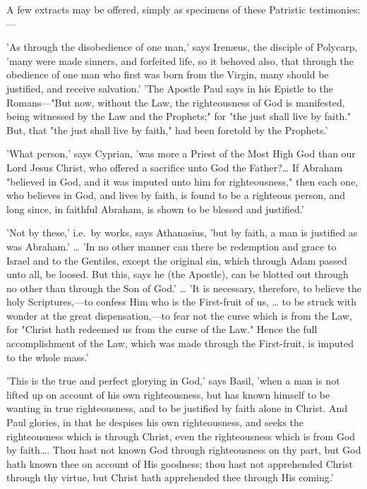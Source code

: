 \documentclass[
]{book}
\begin{document}
A few extracts may be offered, simply as specimens of these Patristic testimonies:---

'As through the disobedience of one man,' says Irenæus, the disciple of Polycarp, 'many were made sinners, and forfeited life, so it behoved also, that through the obedience of one man who first was born from the Virgin, many should be justified, and receive salvation.' 'The Apostle Paul says in his Epistle to the Romans---"But now, without the Law, the righteousness of God is manifested, being witnessed by the Law and the Prophets;" for "the just shall live by faith." But, that "the just shall live by faith," had been foretold by the Prophets.'

'What person,' says Cyprian, 'was more a Priest of the Most High God than our Lord Jesus Christ, who offered a sacrifice unto God the Father?\ldots{} If Abraham "believed in God, and it was imputed unto him for righteousness," then each one, who believes in God, and lives by faith, is found to be a righteous person, and long since, in faithful Abraham, is shown to be blessed and justified.'

'Not by these,' i.e.~by works, says Athanasius, 'but by faith, a man is justified as was Abraham.' \ldots{} 'In no other manner can there be redemption and grace to Israel and to the Gentiles, except the original sin, which through Adam passed unto all, be loosed. But this, says he (the Apostle), can be blotted out through no other than through the Son of God.' \ldots{} 'It is necessary, therefore, to believe the holy Scriptures,---to confess Him who is the First-fruit of us, \ldots{} to be struck with wonder at the great dispensation,---to fear not the curse which is from the Law, for "Christ hath redeemed us from the curse of the Law." Hence the full accomplishment of the Law, which was made through the First-fruit, is imputed to the whole mass.'

'This is the true and perfect glorying in God,' says Basil, 'when a man is not lifted up on account of his own righteousness, but has known himself to be wanting in true righteousness, and to be justified by faith alone in Christ. And Paul glories, in that he despises his own righteousness, and seeks the righteousness which is through Christ, even the righteousness which is from God by faith\ldots. Thou hast not known God through righteousness on thy part, but God hath known thee on account of His goodness; thou hast not apprehended Christ through thy virtue, but Christ hath apprehended thee through His coming.'
\end{document}
